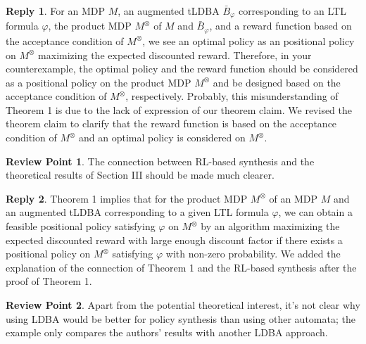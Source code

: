 \documentclass[10 pt, dvipdfmx]{article}
\theoremstyle{definition}
\newtheorem{review point}{Review Point}[section]
\newtheorem*{reply}{Reply}
\begin{document}
\begin{reply}
  For an MDP $M$, an augmented tLDBA $\bar{B}_{\varphi}$ corresponding to an LTL formula $\varphi$, the product MDP $M^{\otimes}$ of $M$ and $\bar{B}_{\varphi}$, and a reward function based on the acceptance condition of $M^{\otimes}$, we see an optimal policy as an positional policy on $M^{\otimes}$ maximizing the expected discounted reward. Therefore, in your counterexample, the optimal policy and the reward function should be considered as a positional policy on the product MDP $M^{\otimes}$ and be designed based on the acceptance condition of $M^{\otimes}$, respectively. Probably, this misunderstanding of Theorem 1 is due to the lack of expression of our theorem claim. We revised the theorem claim to clarify that the reward function is based on the acceptance condition of $M^{\otimes}$ and an optimal policy is considered on $M^{\otimes}$.
\end{reply}

\begin{review point}
  The connection between RL-based synthesis and the theoretical results
of Section III should be made much clearer.
\end{review point}

\begin{reply}
  Theorem 1 implies that for the product MDP $M^{\otimes}$ of an MDP $M$ and an augmented tLDBA corresponding to a given LTL formula $\varphi$, we can obtain a feasible positional policy satisfying $\varphi$ on $M^{\otimes}$ by an algorithm maximizing the expected discounted reward with large enough discount factor if there exists a positional policy on $M^{\otimes}$ satisfying $\varphi$ with non-zero probability. We added the explanation of the connection of Theorem 1 and the RL-based synthesis after the proof of Theorem 1.
\end{reply}

\begin{review point}
  Apart from the potential theoretical interest, it's not clear why
using LDBA would be better for policy synthesis than using other
automata; the example only compares the authors' results with another
LDBA approach.
\end{review point}
\end{document}
